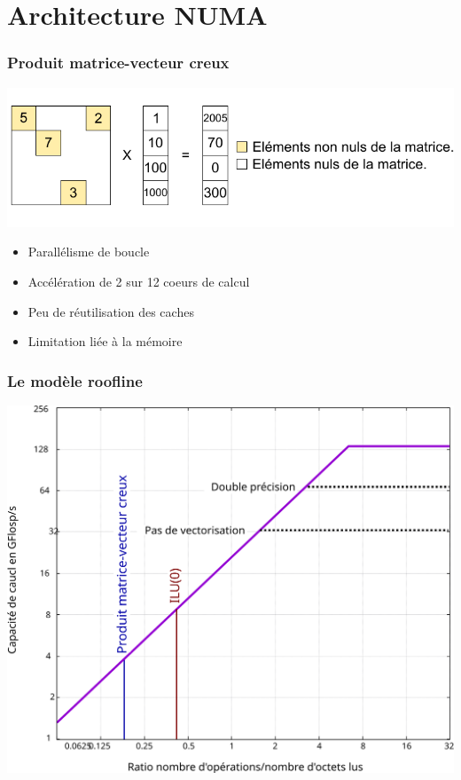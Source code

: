 \documentclass{beamer}
\begin{document}
\section[NUMA]{Architecture NUMA}
\begin{frame}
  \frametitle{Produit matrice-vecteur creux}
  \centerline{\includegraphics[width=\linewidth]{spmv}}

  \begin{itemize}
    \item Parallélisme de boucle
    \item Accélération de 2 sur 12 coeurs de calcul
    \item Peu de réutilisation des caches
    \item Limitation liée à la mémoire
  \end{itemize}
\end{frame}


\begin{frame}
  \frametitle{Le modèle roofline}
  \centerline{\includegraphics[width=0.8\linewidth]{roofline_rostand}}
\end{frame}
\end{document}
